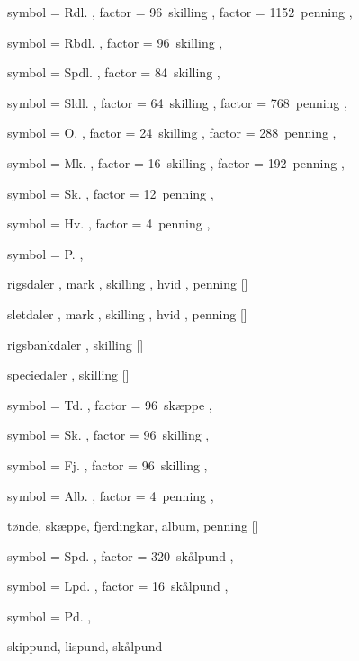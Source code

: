 
 {
	symbol = { Rdl. } ,
	factor = { 96~skilling } ,
	factor = { 1152~penning } ,
}

 {
	symbol = { Rbdl. } ,
	factor = { 96~skilling } ,
}

 {
	symbol = { Spdl. } ,
	factor = { 84~skilling } ,
}

 {
	symbol = { Sldl. } ,
	factor = { 64~skilling } ,
	factor = { 768~penning } ,
}

 {
	symbol = { O. } ,
	factor = { 24~skilling } ,
	factor = { 288~penning } ,
}

 {
	symbol = { Mk. } ,
	factor = { 16~skilling } ,
	factor = { 192~penning } ,
}

 {
	symbol = { Sk. } ,
	factor = { 12~penning } ,
}

 {
	symbol = { Hv. } ,
	factor = { 4~penning } ,
}

 {
	symbol = { P. } ,
}

 {
	rigsdaler ,
	mark ,
	skilling ,
	hvid ,
	penning
}[\rdl]

 {
	sletdaler ,
	mark ,
	skilling ,
	hvid ,
	penning
}[\sldl]

 {
	rigsbankdaler ,
	skilling
}[\rbdl]

 {
	speciedaler ,
	skilling
}[\spdl]


 {
	symbol = { Td. } ,
	factor = { 96~skæppe } ,
}

 {
	symbol = { Sk. } ,
	factor = { 96~skilling } ,
}

 {
	symbol = { Fj. } ,
	factor = { 96~skilling } ,
}

 {
	symbol = { Alb. } ,
	factor = { 4~penning } ,
}

 {
	tønde,
	skæppe,
	fjerdingkar,
	album,
	penning
}[\hartkorn]


 {
	symbol = { Spd. } ,
	factor = { 320~skålpund } ,
}

 {
	symbol = { Lpd. } ,
	factor = { 16~skålpund } ,
}

 {
	symbol = { Pd. } ,
}

 {
	skippund,
	lispund,
	skålpund
}
